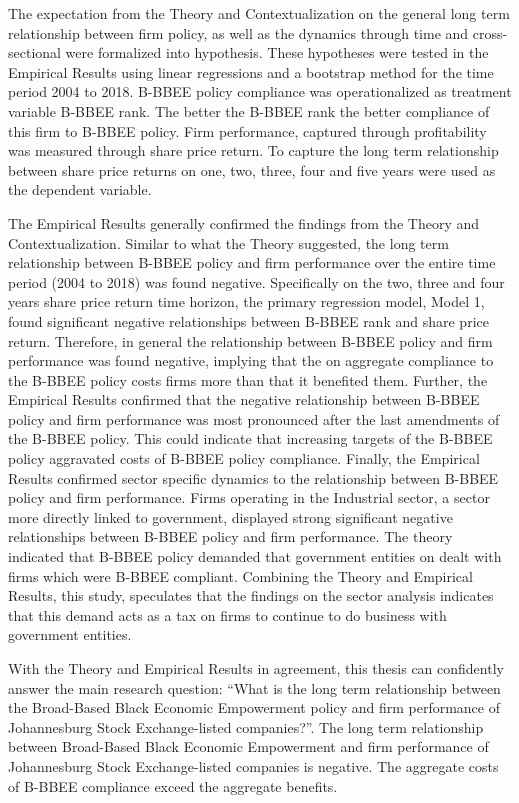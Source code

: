 The expectation from the Theory and Contextualization on the general long term relationship between firm policy, as well as the dynamics through time and cross-sectional were formalized into hypothesis. These hypotheses were tested in the Empirical Results using linear regressions and a bootstrap method for the time period 2004 to 2018. B-BBEE policy compliance was operationalized as treatment variable B-BBEE rank. The better the B-BBEE rank the better compliance of this firm to B-BBEE policy. Firm performance, captured through profitability was measured through share price return. To capture the long term relationship between share price returns on one, two, three, four and five years were used as the dependent variable.

The Empirical Results generally confirmed the findings from the Theory and Contextualization. Similar to what the Theory suggested, the long term relationship between B-BBEE policy and firm performance over the entire time period (2004 to 2018) was found negative. Specifically on the two, three and four years share price return time horizon, the primary regression model, Model 1, found significant negative relationships between B-BBEE rank and share price return. Therefore, in general the relationship between B-BBEE policy and firm performance was found negative, implying that the on aggregate compliance to the B-BBEE policy costs firms more than that it benefited them. Further, the Empirical Results confirmed that the negative relationship between B-BBEE policy and firm performance was most pronounced after the last amendments of the B-BBEE policy. This could indicate that increasing targets of the B-BBEE policy aggravated costs of B-BBEE policy compliance. Finally, the Empirical Results confirmed sector specific dynamics to the relationship between B-BBEE policy and firm performance. Firms operating in the Industrial sector, a sector more directly linked to government, displayed strong significant negative relationships between B-BBEE policy and firm performance. The theory indicated that B-BBEE policy demanded that government entities on dealt with firms which were B-BBEE compliant. Combining the Theory and Empirical Results, this study, speculates that the findings on the sector analysis indicates that this demand acts as a tax on firms to continue to do business with government entities.

With the Theory and Empirical Results in agreement, this thesis can confidently answer the main research question: “What is the long term relationship between the Broad-Based Black Economic Empowerment policy and firm performance of Johannesburg Stock Exchange-listed companies?”.  The long term relationship between Broad-Based Black Economic Empowerment and firm performance of Johannesburg Stock Exchange-listed companies is negative. The aggregate costs of B-BBEE compliance exceed the aggregate benefits. 
